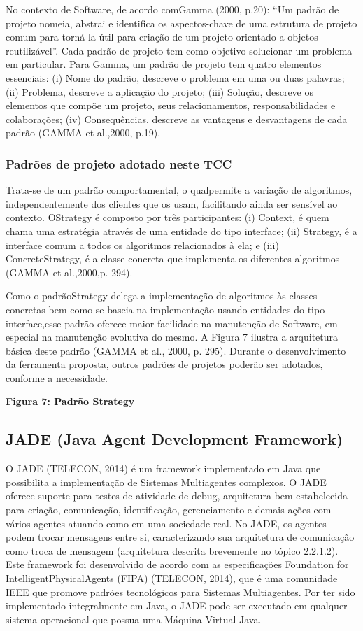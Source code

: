 No contexto de Software, de acordo comGamma (2000, p.20): “Um padrão de projeto nomeia, abstrai e identifica os aspectos-chave de uma estrutura de projeto comum para torná-la útil para criação de um projeto orientado a objetos reutilizável”. Cada padrão de projeto tem como objetivo solucionar um problema em particular. Para Gamma, um padrão de projeto tem quatro elementos essenciais: (i) Nome do padrão, descreve o problema em uma ou duas palavras; (ii) Problema, descreve a aplicação do projeto; (iii) Solução, descreve os elementos que compõe um projeto, seus relacionamentos, responsabilidades e colaborações; (iv) Consequências, descreve as vantagens e desvantagens de cada padrão (GAMMA et al.,2000, p.19).

\subsubsection{Padrões de projeto adotado neste TCC}


Trata-se de um padrão comportamental, o qualpermite a variação de algoritmos, independentemente dos clientes que os usam, facilitando ainda ser sensível ao contexto. OStrategy é composto por três participantes: (i) Context, é quem chama uma estratégia através de uma entidade do tipo interface; (ii) Strategy, é a interface comum a todos os algoritmos relacionados à ela; e (iii) ConcreteStrategy, é a classe concreta que implementa os diferentes algoritmos (GAMMA et al.,2000,p. 294). 

Como o padrãoStrategy delega a implementação de algoritmos às classes concretas bem como se baseia na implementação usando entidades do tipo interface,esse padrão oferece maior facilidade na manutenção de Software, em especial na manutenção evolutiva do mesmo. A Figura 7 ilustra a arquitetura básica deste padrão (GAMMA et al., 2000, p. 295). Durante o desenvolvimento da ferramenta proposta, outros padrões de projetos poderão ser adotados, conforme a necessidade.

\textbf{Figura 7: Padrão Strategy}

\subsection{JADE (Java Agent Development Framework)}

O JADE (TELECON, 2014) é um framework implementado em Java que possibilita a implementação de Sistemas Multiagentes complexos. O JADE oferece suporte para testes de atividade de debug, arquitetura bem estabelecida para criação, comunicação, identificação, gerenciamento e demais ações com vários agentes atuando como em uma sociedade real. No JADE, os agentes podem trocar mensagens entre si, caracterizando sua arquitetura de comunicação como troca de mensagem (arquitetura descrita brevemente no tópico 2.2.1.2). Este framework foi desenvolvido de acordo com as especificações Foundation for IntelligentPhysicalAgents (FIPA) (TELECON, 2014), que é uma comunidade IEEE que promove padrões tecnológicos para Sistemas Multiagentes. Por ter sido implementado integralmente em Java, o JADE pode ser executado em qualquer sistema operacional que possua uma Máquina Virtual Java.

